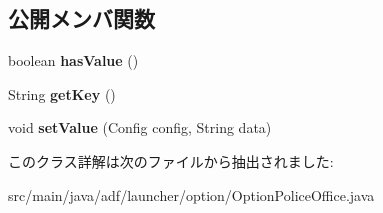 \subsection*{公開メンバ関数}
\begin{DoxyCompactItemize}
\item 
\hypertarget{classadf_1_1launcher_1_1option_1_1OptionPoliceOffice_a1f4a4e91437beeb89918e9b186b31f60}{}\label{classadf_1_1launcher_1_1option_1_1OptionPoliceOffice_a1f4a4e91437beeb89918e9b186b31f60} 
boolean {\bfseries has\+Value} ()
\item 
\hypertarget{classadf_1_1launcher_1_1option_1_1OptionPoliceOffice_aa6fc4229aaf8fabaf5cb3d5dbcca8a4b}{}\label{classadf_1_1launcher_1_1option_1_1OptionPoliceOffice_aa6fc4229aaf8fabaf5cb3d5dbcca8a4b} 
String {\bfseries get\+Key} ()
\item 
\hypertarget{classadf_1_1launcher_1_1option_1_1OptionPoliceOffice_ade4e72277cbf70e03f728830dfb0fb0f}{}\label{classadf_1_1launcher_1_1option_1_1OptionPoliceOffice_ade4e72277cbf70e03f728830dfb0fb0f} 
void {\bfseries set\+Value} (Config config, String data)
\end{DoxyCompactItemize}


このクラス詳解は次のファイルから抽出されました\+:\begin{DoxyCompactItemize}
\item 
src/main/java/adf/launcher/option/Option\+Police\+Office.\+java\end{DoxyCompactItemize}
